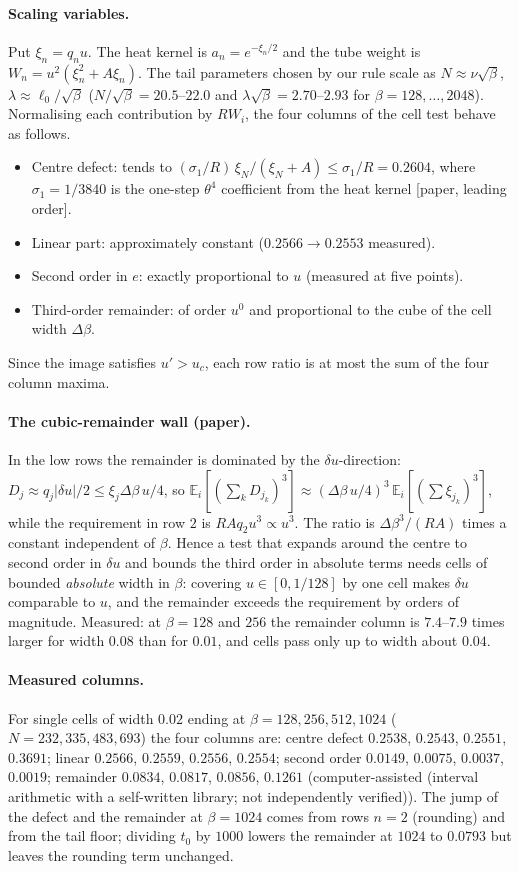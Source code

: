 \documentclass[11pt,a4paper]{article}
\theoremstyle{definition}
\theoremstyle{remark}
\newcommand{\IA}{computer-assisted (interval arithmetic with a self-written library; not independently verified)}
\begin{document}
\paragraph{Scaling variables.}
Put $\xi_n=q_nu$. The heat kernel is $a_n=e^{-\xi_n/2}$ and the tube weight is $W_n=u^2(\xi_n^2+A\xi_n)$.
The tail parameters chosen by our rule scale as $N\approx\nu\sqrt\beta$, $\lambda\approx\ell_0/\sqrt\beta$ ($N/\sqrt\beta=20.5$--$22.0$ and $\lambda\sqrt\beta=2.70$--$2.93$ for $\beta=128,\dots,2048$).
Normalising each contribution by $RW_i$, the four columns of the cell test behave as follows.
\begin{itemize}[nosep]
\item Centre defect: tends to $(\sigma_1/R)\,\xi_N/(\xi_N+A)\le\sigma_1/R=0.2604$, where $\sigma_1=1/3840$ is the one-step $\theta^4$ coefficient from the heat kernel [paper, leading order].
\item Linear part: approximately constant ($0.2566\to0.2553$ measured).
\item Second order in $e$: exactly proportional to $u$ (measured at five points).
\item Third-order remainder: of order $u^0$ and proportional to the cube of the cell width $\Delta\beta$.
\end{itemize}
Since the image satisfies $u'>u_c$, each row ratio is at most the sum of the four column maxima.

\paragraph{The cubic-remainder wall (paper).}
In the low rows the remainder is dominated by the $\delta u$-direction: $D_j\approx q_j|\delta u|/2\le\xi_j\Delta\beta\,u/4$, so $\mathbb{E}_i[(\sum_kD_{j_k})^3]\approx(\Delta\beta\,u/4)^3\,\mathbb{E}_i[(\sum\xi_{j_k})^3]$, while the requirement in row $2$ is $RAq_2u^3\propto u^3$.
The ratio is $\Delta\beta^3/(RA)$ times a constant independent of $\beta$.
Hence a test that expands around the centre to second order in $\delta u$ and bounds the third order in absolute terms needs cells of bounded \emph{absolute} width in $\beta$: covering $u\in[0,1/128]$ by one cell makes $\delta u$ comparable to $u$, and the remainder exceeds the requirement by orders of magnitude.
Measured: at $\beta=128$ and $256$ the remainder column is $7.4$--$7.9$ times larger for width $0.08$ than for $0.01$, and cells pass only up to width about $0.04$.

\paragraph{Measured columns.}
For single cells of width $0.02$ ending at $\beta=128,256,512,1024$ ($N=232,335,483,693$) the four columns are: centre defect $0.2538$, $0.2543$, $0.2551$, $0.3691$; linear $0.2566$, $0.2559$, $0.2556$, $0.2554$; second order $0.0149$, $0.0075$, $0.0037$, $0.0019$; remainder $0.0834$, $0.0817$, $0.0856$, $0.1261$ (\IA).
The jump of the defect and the remainder at $\beta=1024$ comes from rows $n=2$ (rounding) and from the tail floor; dividing $t_0$ by $1000$ lowers the remainder at $1024$ to $0.0793$ but leaves the rounding term unchanged.
\end{document}

